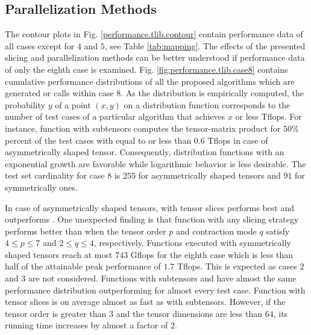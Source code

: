 \subsection{Parallelization Methods}
The contour plots in Fig. \ref{performance.tlib.contour} contain performance data of all cases except for $4$ and $5$, see Table \ref{tab:mapping}.
The effects of the presented slicing and parallelization methods can be better understood if performance data of only the eighth case is examined.
Fig. \ref{fig:performance.tlib.case8} contains cumulative performance distributions of all the proposed algorithms which are generated  or  calls within case 8.
As the distribution is empirically computed, the probability $y$ of a point $(x,y)$ on a distribution function corresponds to the number of test cases of a particular algorithm that achieves $x$ or less Tflops.
For instance, function  with subtensors computes the tensor-matrix product for $50$\% percent of the test cases with equal to or less than 0.6 Tflops in case of asymmetrically shaped tensor.
Consequently, distribution functions with an exponential growth are favorable while logarithmic behavior is less desirable.
The test set cardinality for case 8 is $255$ for asymmetrically shaped tensors and $91$ for symmetrically ones.

In case of asymmetrically shaped tensors,  with tensor slices performs best and outperforms .
One unexpected finding is that function  with any slicing strategy performs better than  when the tensor order $p$ and contraction mode $q$ satisfy $4 \leq p \leq 7$ and $2 \leq q \leq 4$, respectively.
Functions executed with symmetrically shaped tensors reach at most $743$ Gflops for the eighth case which is less than half of the attainable peak performance of $1.7$ Tflops.
This is expected as cases $2$ and $3$ are not considered.
Functions  with subtensors and  have almost the same performance distribution outperforming  for almost every test case.
Function  with tensor slices is on average almost as fast as with subtensors.
However, if the tensor order is greater than $3$ and the tensor dimensions are less than $64$, its running time increases by almost a factor of $2$.

